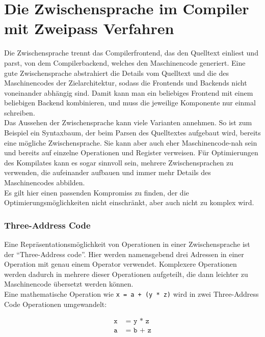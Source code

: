 \chapter{Die Zwischensprache im Compiler mit Zweipass Verfahren}
\label{chap:theory:inBetweenLayer}

Die Zwischensprache trennt das Compilerfrontend, das den Quelltext einliest und parst, von dem Compilerbackend, welches den Maschinencode generiert.
Eine gute Zwischensprache abstrahiert die Details vom Quelltext und die des Maschinencodes der Zielarchitektur, sodass die Frontends und Backends nicht voneinander abhängig sind.
Damit kann man ein beliebiges Frontend mit einem beliebigen Backend kombinieren, und muss die jeweilige Komponente nur einmal schreiben.\\
Das Aussehen der Zwischensprache kann viele Varianten annehmen.
So ist zum Beispiel ein Syntaxbaum, der beim Parsen des Quelltextes aufgebaut wird, bereits eine mögliche Zwischensprache.
Sie kann aber auch eher Maschinencode-nah sein und bereits auf einzelne Operationen und Register verweisen.
Für Optimierungen des Kompilates kann es sogar sinnvoll sein, mehrere Zwischensprachen zu verwenden, die aufeinander aufbauen und immer mehr Details des Maschinencodes abbilden.\\
Es gilt hier einen passenden Kompromiss zu finden, der die Optimierungsmöglichkeiten nicht einschränkt, aber auch nicht zu komplex wird.\\

\subsection{Three-Address Code}

Eine Repräsentationsmöglichkeit von Operationen in einer Zwischensprache ist der ``Three-Address code''.
Hier werden namensgebend drei Adressen in einer Operation mit genau einem Operator verwendet\cite{aho:2006}.
Komplexere Operationen werden dadurch in mehrere dieser Operationen aufgeteilt, die dann leichter zu Maschinencode übersetzt werden können.\\
Eine mathematische Operation wie \texttt{x = a + (y * z)} wird in zwei Three-Address Code Operationen umgewandelt:
\begin{figure}[H]
  \begin{align*}
    \texttt{x} &\texttt{\ = y * z}\\
    \texttt{a} &\texttt{\ = b + z}
  \end{align*}
\end{figure}

